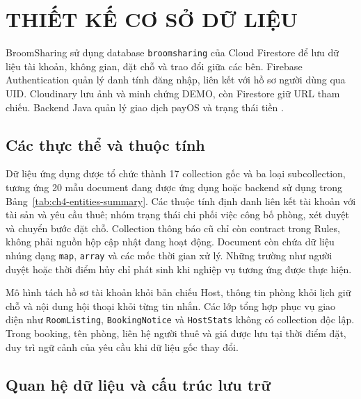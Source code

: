 \chapstart
\section{THIẾT KẾ CƠ SỞ DỮ LIỆU}
\label{sec:database-design}
\begingroup
{}
\setlength{\emergencystretch}{1em}

BroomSharing sử dụng database \texttt{broomsharing} của Cloud Firestore để lưu dữ liệu tài khoản, không gian, đặt chỗ và trao đổi giữa các bên. Firebase Authentication quản lý danh tính đăng nhập, liên kết với hồ sơ người dùng qua UID. Cloudinary lưu ảnh và minh chứng DEMO, còn Firestore giữ URL tham chiếu. Backend Java quản lý giao dịch payOS và trạng thái tiền \parencite{broomsharing_source}.

\subsection{Các thực thể và thuộc tính}
\label{sec:ch4-entities}

Dữ liệu ứng dụng được tổ chức thành 17 collection gốc và ba loại subcollection, tương ứng 20 mẫu document đang được ứng dụng hoặc backend sử dụng trong Bảng~\ref{tab:ch4-entities-summary}. Các thuộc tính định danh liên kết tài khoản với tài sản và yêu cầu thuê; nhóm trạng thái chi phối việc công bố phòng, xét duyệt và chuyển bước đặt chỗ. Collection thông báo cũ chỉ còn contract trong Rules, không phải nguồn hộp cập nhật đang hoạt động. Document còn chứa dữ liệu nhúng dạng \texttt{map}, \texttt{array} và các mốc thời gian xử lý. Những trường như người duyệt hoặc thời điểm hủy chỉ phát sinh khi nghiệp vụ tương ứng được thực hiện.



Mô hình tách hồ sơ tài khoản khỏi bản chiếu Host, thông tin phòng khỏi lịch giữ chỗ và nội dung hội thoại khỏi từng tin nhắn. Các lớp tổng hợp phục vụ giao diện như \texttt{Room\allowbreak{}Listing}, \texttt{Booking\allowbreak{}Notice} và \texttt{Host\allowbreak{}Stats} không có collection độc lập. Trong booking, tên phòng, liên hệ người thuê và giá được lưu tại thời điểm đặt, duy trì ngữ cảnh của yêu cầu khi dữ liệu gốc thay đổi.

\subsection{Quan hệ dữ liệu và cấu trúc lưu trữ}
\label{sec:ch4-relationships}

